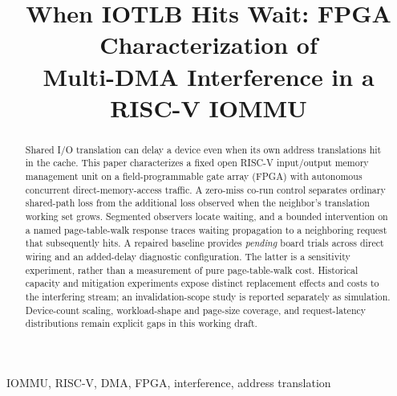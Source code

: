 \documentclass[conference,10pt,letterpaper]{IEEEtran}
\title{When IOTLB Hits Wait: FPGA Characterization of\texorpdfstring{\\}{ }Multi-DMA Interference in a RISC-V IOMMU}
\author{\IEEEauthorblockN{Anonymous Authors}}
\newcommand{\claim}[1]{}
\providecommand{\BaselineTotalRuns}{\textit{pending}}
\begin{document}
\maketitle
\pagestyle{plain}\thispagestyle{plain}
\begin{abstract}
Shared I/O translation can delay a device even when its own address translations hit in the cache.\claim{R-E3} This paper characterizes a fixed open RISC-V input/output memory management unit on a field-programmable gate array (FPGA) with autonomous concurrent direct-memory-access traffic.\claim{M-IDENTITY} A zero-miss co-run control separates ordinary shared-path loss from the additional loss observed when the neighbor's translation working set grows.\claim{M-CONTROLS} Segmented observers locate waiting, and a bounded intervention on a named page-table-walk response traces waiting propagation to a neighboring request that subsequently hits.\claim{M-PATH}\claim{R-E3} A repaired baseline provides \BaselineTotalRuns{} board trials across direct wiring and an added-delay diagnostic configuration.\claim{M-BASELINE} The latter is a sensitivity experiment, rather than a measurement of pure page-table-walk cost.\claim{M-DS} Historical capacity and mitigation experiments expose distinct replacement effects and costs to the interfering stream; an invalidation-scope study is reported separately as simulation.\claim{R-CAPACITY}\claim{R-MITIGATION}\claim{R-INVALIDATION} Device-count scaling, workload-shape and page-size coverage, and request-latency distributions remain explicit gaps in this working draft.\claim{G-COVERAGE}
\end{abstract}
\begin{IEEEkeywords}
IOMMU, RISC-V, DMA, FPGA, interference, address translation
\end{IEEEkeywords}









\end{document}
